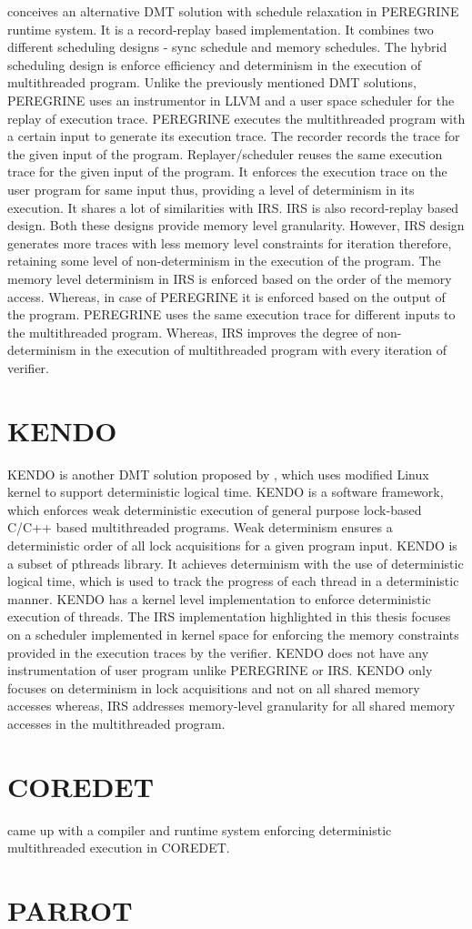 \citet{peregrine} conceives an alternative DMT solution with schedule relaxation in PEREGRINE runtime system. 
It is a record-replay based implementation. 
It combines two different scheduling designs - sync schedule and memory schedules. 
The hybrid scheduling design is enforce efficiency and determinism in the execution of multithreaded program. 
Unlike the previously mentioned DMT solutions, PEREGRINE uses an instrumentor in LLVM and a user space scheduler for the replay of execution trace. 
PEREGRINE executes the multithreaded program with a certain input to generate its execution trace. 
The recorder records the trace for the given input of the program. 
Replayer/scheduler reuses the same execution trace for the given input of the program. 
It enforces the execution trace on the user program for same input thus, providing a level of determinism in its execution. 
It shares a lot of similarities with IRS. 
IRS is also record-replay based design. 
Both these designs provide memory level granularity. 
However, IRS design generates more traces with less memory level constraints for iteration therefore, retaining some level of non-determinism in the execution of the program. 
The memory level determinism in IRS is enforced based on the order of the memory access. Whereas, in case of PEREGRINE it is enforced based on the output of the program. 
PEREGRINE uses the same execution trace for different inputs to the multithreaded program. 
Whereas, IRS improves the degree of non-determinism in the execution of multithreaded program with every iteration of verifier.

\section{KENDO}

KENDO is another DMT solution proposed by \citet{kendo}, which uses modified Linux kernel to support deterministic logical time. 
KENDO is a software framework, which enforces weak deterministic execution of general purpose lock-based C/C++ based multithreaded programs.  
Weak determinism ensures a deterministic order of all lock acquisitions for a given program input.   
KENDO is a subset of pthreads library. 
It achieves determinism with the use of deterministic logical time, which is used to track the progress of each thread in a deterministic manner. 
KENDO has a kernel level implementation to enforce deterministic execution of threads. 
The IRS implementation highlighted in this thesis focuses on a scheduler implemented in kernel space for enforcing the memory constraints provided in the execution traces by the verifier. 
KENDO does not have any instrumentation of user program unlike PEREGRINE or IRS. 
KENDO only focuses on determinism in lock acquisitions and not on all shared memory accesses whereas, IRS addresses memory-level granularity for all shared memory accesses in the multithreaded program.

\section{COREDET}

\citet{coredet} came up with a compiler and runtime system enforcing deterministic multithreaded execution in COREDET. 


\section{PARROT}

\citet{parrot}
